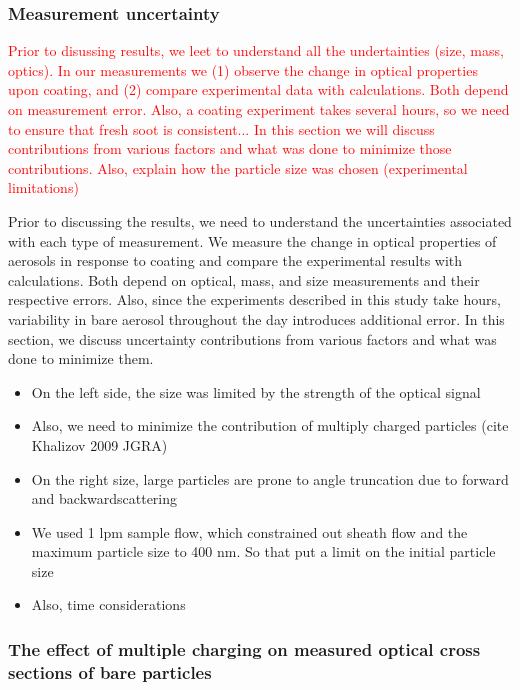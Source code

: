 \label{sec:optical}

\subsubsection{Measurement uncertainty}

\label{sec:uncertainty}

\textcolor{red}{Prior to disussing results, we leet to understand all the undertainties (size, mass, optics). In our measurements we (1) observe the change in optical properties upon coating, and (2) compare experimental data with calculations. Both depend on measurement error. Also, a coating experiment takes several hours, so we need to ensure that fresh soot is consistent... In this section we will discuss contributions from various factors and what was done to minimize those contributions. Also, explain how the particle size was chosen (experimental limitations)}

Prior to discussing the results, we need to understand the uncertainties associated with each type of measurement. We measure the change in optical properties of aerosols in response to coating and compare the experimental results with calculations. Both depend on optical, mass, and size measurements and their respective errors. Also, since the experiments described in this study take hours, variability in bare aerosol throughout the day introduces additional error. In this section, we discuss uncertainty contributions from various factors and what was done to minimize them.

\begin{itemize}
    \item On the left side, the size was limited by the strength of the optical signal
    \item Also, we need to minimize the contribution of multiply charged particles (cite Khalizov 2009 JGRA)
    \item On the right size, large particles are prone to angle truncation due to forward and backwardscattering
    \item We used 1 lpm sample flow, which constrained out sheath flow and the maximum particle size to 400 nm. So that put a limit on the initial particle size
    \item Also, time considerations
\end{itemize}

\subsubsection{The effect of multiple charging on measured optical cross sections of bare particles}

